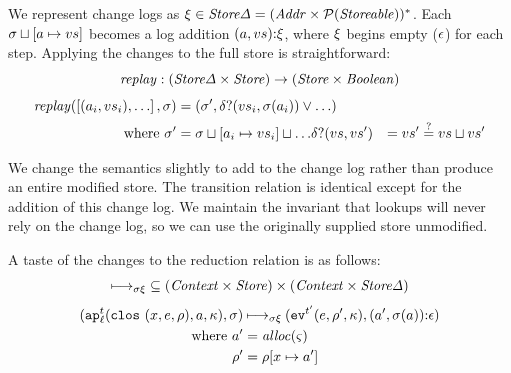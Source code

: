 \documentclass[preprint,onecolumn,9pt]{sigplanconf} %
\begin{document}
We represent change logs as $\msdiff \in \StoreDelta = (\Addr \times
  \Set(\Storeable))^*$. Each $\msto\sqcup[\maddr \mapsto \mval{s}]$
 becomes a log addition
$\cons{\ttuple{\maddr}{\mval{s}}}{\msdiff}$, where $\msdiff$ begins
empty ($\mtlst$) for each step. Applying the changes to the full store
is straightforward:
\begin{equation*}
\replay : (\StoreDelta \times \Store) \to (\Store \times \Boolean)
\end{equation*}
\begin{align*}
\replay(\left[ \ttuple{\maddr_i}{\mval{s_i}}, \ldots\right], \msto) &=
\ttuple{\msto'}
       {\diffp(\mval{s_i}, \msto(\maddr_i)) \vee \ldots} \\
\text{ where } \msto' &= {\msto \sqcup [\maddr_i \mapsto \mval{s_i}] \sqcup \ldots}
\diffp(\mval{s}, \mval{s'}) &= \mval{s'} \overset{?}{=} \mval{s} \sqcup \mval{s'}
\end{align*}

We change the semantics slightly to add to the change log rather than
produce an entire modified store.  The transition relation is
identical except for the addition of this change log.  We maintain the
invariant that lookups will never rely on the change log, so we can
use the originally supplied store unmodified.

A taste of the changes to the reduction relation is as follows:
\begin{equation*}
\dmachstep \subseteq (\Context\times\Store) \times (\Context\times\StoreDelta) 
\end{equation*}
\begin{align*}
\ttuple{\ap[^\mcntr_\mlab]{\clos{\mvar,\mexp,\menv},\maddr,\mkont}}{\msto} & \dmachstep
\ttuple{\ev[^{\mcntr'}]{\mexp,\menv',\mkont}}{\cons{\ttuple{\maddr'}{\msto(\maddr)}}{\epsilon}} \\
\text{ where }\maddr' &= \alloc(\mstate) \\
              \menv' &= \menv[\mvar\mapsto\maddr']
\end{align*}

\end{document}
